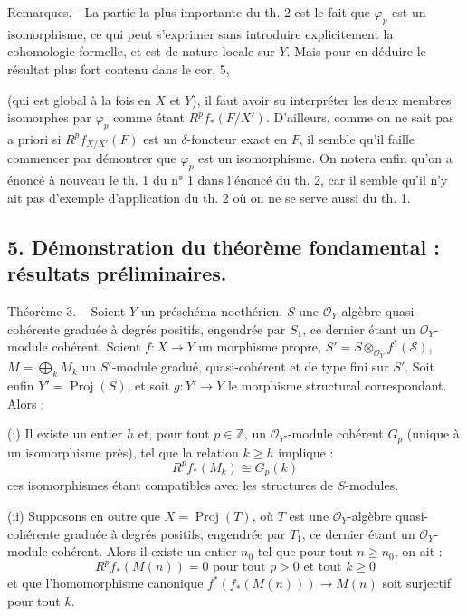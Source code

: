 Remarques. - La partie la plus importante du th. 2 est le fait que $\varphi_p$ est un isomorphisme, ce qui peut s'exprimer sans introduire explicitement la cohomologie formelle, et est de nature locale sur $Y$. Mais pour en déduire le résultat plus fort contenu dans le cor. 5,

\newpage


(qui est global à la fois en $X$ et $Y$), il faut avoir su interpréter les deux membres isomorphes par $\varphi_p$ comme étant $R^p f_* (F/X')$. D'ailleurs, comme on ne sait pas a priori si $R^p f_{X/X'} (F)$ est un $\delta$-foncteur exact en $F$, il semble qu'il faille commencer par démontrer que $\varphi_p$ est un isomorphisme. On notera enfin qu'on a énoncé à nouveau le th. 1 du n° 1 dans l'énoncé du th. 2, car il semble qu'il n'y ait pas d'exemple d'application du th. 2 où on ne se serve aussi du th. 1.

\subsection*{5. Démonstration du théorème fondamental : résultats préliminaires.}

Théorème 3. -- Soient $Y$ un préschéma noethérien, $S$ une $\mathcal{O}_Y$-algèbre quasi-cohérente graduée à degrés positifs, engendrée par $S_1$, ce dernier étant un $\mathcal{O}_Y$-module cohérent. Soient $f : X \to Y$ un morphisme propre, $S' = S \otimes_{\mathcal{O}_Y} f^* (\mathcal{S})$, $M = \bigoplus_k M_k$ un $S'$-module gradué, quasi-cohérent et de type fini sur $S'$. Soit enfin $Y' = \operatorname{Proj}(S)$, et soit $g : Y' \to Y$ le morphisme structural correspondant. Alors :

(i) Il existe un entier $h$ et, pour tout $p \in \mathbb{Z}$, un $\mathcal{O}_{Y'}$-module cohérent $G_p$ (unique à un isomorphisme près), tel que la relation $k \ge h$ implique :
$$R^p f_* (M_k) \cong G_p(k)$$
ces isomorphismes étant compatibles avec les structures de $S$-modules.

(ii) Supposons en outre que $X = \operatorname{Proj}(T)$, où $T$ est une $\mathcal{O}_Y$-algèbre quasi-cohérente graduée à degrés positifs, engendrée par $T_1$, ce dernier étant un $\mathcal{O}_Y$-module cohérent. Alors il existe un entier $n_0$ tel que pour tout $n \ge n_0$, on ait :
$$R^p f_* (M(n)) = 0 \text{ pour tout } p > 0 \text{ et tout } k \ge 0$$
et que l'homomorphisme canonique $f^* (f_* (M(n))) \to M(n)$ soit surjectif pour tout $k$.

